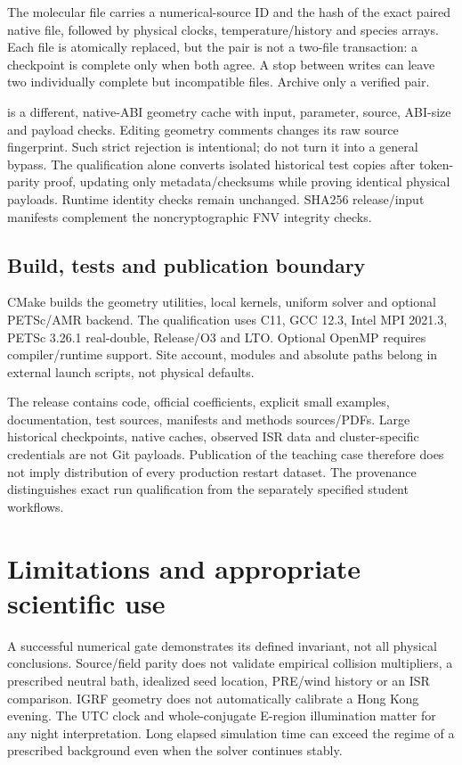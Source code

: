 The molecular  file carries a numerical-source ID and the
hash of the exact paired native file, followed by physical clocks,
temperature/history and species arrays. Each file is atomically replaced,
but the pair is not a two-file transaction: a checkpoint is complete only
when both agree. A stop between writes can leave two individually complete
but incompatible files. Archive only a verified pair.

 is a different, native-ABI geometry cache with input,
parameter, source, ABI-size and payload checks. Editing geometry comments
changes its raw source fingerprint. Such strict rejection is intentional;
do not turn it into a general bypass. The qualification alone converts
isolated historical test copies after token-parity proof, updating only
metadata/checksums while proving identical physical payloads. Runtime
identity checks remain unchanged. SHA256 release/input manifests complement
the noncryptographic FNV integrity checks.

\subsection{Build, tests and publication boundary}
CMake builds the geometry utilities, local kernels, uniform solver and
optional PETSc/AMR backend. The qualification uses C11, GCC 12.3, Intel
MPI 2021.3, PETSc 3.26.1 real-double, Release/O3 and LTO. Optional OpenMP
requires compiler/runtime support. Site account, modules and absolute
paths belong in external launch scripts, not physical defaults.

The release contains code, official coefficients, explicit small examples,
documentation, test sources, manifests and methods sources/PDFs. Large
historical checkpoints, native caches, observed ISR data and cluster-specific
credentials are not Git payloads. Publication of the teaching case therefore
does not imply distribution of every production restart dataset. The
provenance distinguishes exact run qualification from the separately
specified student workflows.

\section{Limitations and appropriate scientific use}
A successful numerical gate demonstrates its defined invariant, not all
physical conclusions. Source/field parity does not validate empirical
collision multipliers, a prescribed neutral bath, idealized seed location,
PRE/wind history or an ISR comparison. IGRF geometry does not automatically
calibrate a Hong Kong evening. The UTC clock and whole-conjugate E-region
illumination matter for any night interpretation. Long elapsed simulation
time can exceed the regime of a prescribed background even when the solver
continues stably.

